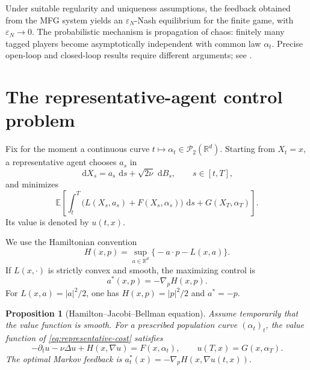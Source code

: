 \documentclass[11pt,a4paper]{article}
\newtheorem{proposition}[theorem]{Proposition}
\theoremstyle{definition}
\newcommand{\RR}{\mathbb R}
\newcommand{\Ptwo}{\mathcal P_2}
\newcommand{\dd}{\,\mathrm d}
\newcommand{\eps}{\varepsilon}
\newcommand{\abs}[1]{\left\lvert#1\right\rvert}
\newcommand{\al}{\alpha}
\begin{document}
Under suitable regularity and uniqueness assumptions, the feedback obtained
from the MFG system yields an $\eps_N$-Nash equilibrium for the finite game,
with $\eps_N\to0$.  The probabilistic mechanism is propagation of chaos:
finitely many tagged players become asymptotically independent with common law
$\al_t$.  Precise open-loop and closed-loop results require different
arguments; see \citet{CarmonaDelarueLacker2016,Lacker2020,
CardaliaguetDelarueLasryLions2019}.

\section{The representative-agent control problem}

Fix for the moment a continuous curve
$t\mapsto\al_t\in\Ptwo(\RR^d)$.  Starting from $X_t=x$, a representative
agent chooses $a_s$ in
\begin{equation}\label{eq:representative-sde}
  \dd X_s=a_s\,\dd s+\sqrt{2\nu}\,\dd B_s,
  \qquad s\in[t,T],
\end{equation}
and minimizes
\begin{equation}\label{eq:representative-cost}
  \mathbb E\!\left[
    \int_t^T\bigl(L(X_s,a_s)+F(X_s,\al_s)\bigr)\,\dd s
    +G(X_T,\al_T)
  \right].
\end{equation}
Its value is denoted by $u(t,x)$.

We use the Hamiltonian convention
\begin{equation}\label{eq:mfg-hamiltonian}
  H(x,p)=\sup_{a\in\RR^d}\bigl\{-a\cdot p-L(x,a)\bigr\}.
\end{equation}
If $L(x,\cdot)$ is strictly convex and smooth, the maximizing control is
\begin{equation}\label{eq:optimal-feedback}
  a^*(x,p)=-\nabla_pH(x,p).
\end{equation}
For $L(x,a)=\abs a^2/2$, one has $H(x,p)=\abs p^2/2$ and $a^*=-p$.

\begin{proposition}[Hamilton--Jacobi--Bellman equation]
\label{prop:hjb-fixed-population}
Assume temporarily that the value function is smooth.  For a prescribed
population curve $(\al_t)_t$, the value function of
\eqref{eq:representative-cost} satisfies
\begin{equation}\label{eq:mfg-hjb-fixed}
  -\partial_tu-\nu\Delta u+H(x,\nabla u)=F(x,\al_t),
  \qquad
  u(T,x)=G(x,\al_T).
\end{equation}
The optimal Markov feedback is
$a_t^*(x)=-\nabla_pH(x,\nabla u(t,x))$.
\end{proposition}
\end{document}
